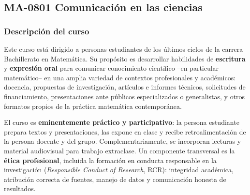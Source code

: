 \newpage
\subsection*{MA-0801 Comunicación en las ciencias}

\hypertarget{MA0801}{}
\begin{refsection}
\begin{table}[H]
\end{table}

\subsubsection*{Descripción del curso}

Este curso está dirigido a personas estudiantes de los últimos ciclos de la carrera Bachillerato en Matemática. Su propósito es desarrollar habilidades de \textbf{escritura} y \textbf{expresión oral} para comunicar conocimiento científico --en particular matemático-- en una amplia variedad de contextos profesionales y académicos: docencia, propuestas de investigación, artículos e informes técnicos, solicitudes de financiamiento, presentaciones ante públicos especializados o generalistas, y otros formatos propios de la práctica matemática contemporánea.

El curso es \textbf{eminentemente práctico y participativo}: la persona estudiante prepara textos y presentaciones, las expone en clase y recibe retroalimentación de la persona docente y del grupo. Complementariamente, se incorporan lecturas y material audiovisual para trabajo extraclase. Un componente transversal es la \textbf{ética profesional}, incluida la formación en conducta responsable en la investigación (\emph{Responsible Conduct of Research}, RCR): integridad académica, atribución correcta de fuentes, manejo de datos y comunicación honesta de resultados.


\end{refsection}
